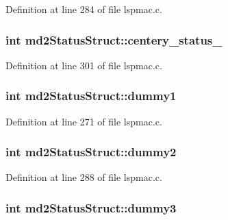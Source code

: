 Definition at line 284 of file lspmac.\-c.

\hypertarget{structmd2StatusStruct_aa242098c185cce8f852cd6e081ef0b1d}{
\subsubsection[{centery\-\_\-status\-\_\-2}]{\setlength{\rightskip}{0pt plus 5cm}int md2\-Status\-Struct\-::centery\-\_\-status\-\_}}\label{structmd2StatusStruct_aa242098c185cce8f852cd6e081ef0b1d}


Definition at line 301 of file lspmac.\-c.

\hypertarget{structmd2StatusStruct_a3a2dff3e6a1a346806a655e8404e0f53}{
\subsubsection[{dummy1}]{\setlength{\rightskip}{0pt plus 5cm}int md2\-Status\-Struct\-::dummy1}}\label{structmd2StatusStruct_a3a2dff3e6a1a346806a655e8404e0f53}


Definition at line 271 of file lspmac.\-c.

\hypertarget{structmd2StatusStruct_a4df936acc498498baba111edb82597a1}{
\subsubsection[{dummy2}]{\setlength{\rightskip}{0pt plus 5cm}int md2\-Status\-Struct\-::dummy2}}\label{structmd2StatusStruct_a4df936acc498498baba111edb82597a1}


Definition at line 288 of file lspmac.\-c.

\hypertarget{structmd2StatusStruct_adb2dc5bdbf99def51018558201508009}{
\subsubsection[{dummy3}]{\setlength{\rightskip}{0pt plus 5cm}int md2\-Status\-Struct\-::dummy3}}\label{structmd2StatusStruct_adb2dc5bdbf99def51018558201508009}


